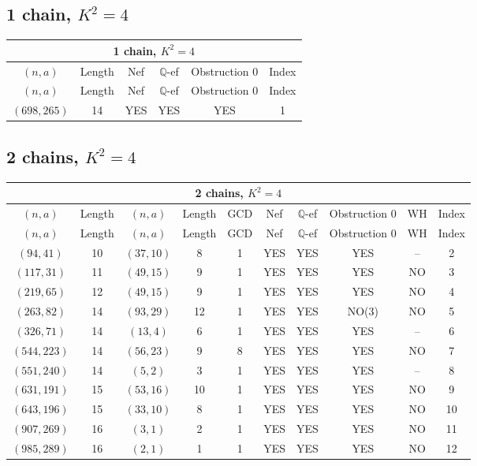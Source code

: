 \subsection{1 chain, $K^2 = 4$}
\begin{longtable}{|c|c|c|c|c|c|}
\hline
\multicolumn{6}{|c|}{1 chain, $K^2 = 4$}\\
\hline
$(n,a)$ & Length & Nef & $\mathbb Q$-ef & Obstruction 0 & Index\\
\hline
\endfirsthead

\hline
$(n,a)$ & Length & Nef & $\mathbb Q$-ef & Obstruction 0 & Index\\
\hline
\endhead
\hline
\endfoot

$(698, 265)$ & 14 & YES & YES & YES & 1
\end{longtable}
\subsection{2 chains, $K^2 = 4$}
\begin{longtable}{|c|c|c|c|c|c|c|c|c|c|}
\hline
\multicolumn{10}{|c|}{2 chains, $K^2 = 4$}\\
\hline
$(n,a)$ & Length & $(n,a)$ & Length & GCD & Nef & $\mathbb Q$-ef & Obstruction 0 & WH & Index\\
\hline
\endfirsthead

\hline
$(n,a)$ & Length & $(n,a)$ & Length & GCD & Nef & $\mathbb Q$-ef & Obstruction 0 & WH & Index\\
\hline
\endhead
\hline
\endfoot

$(94, 41)$ & 10 & $(37, 10)$ & 8 & 1 & YES & YES & YES & -- & 2\\
$(117, 31)$ & 11 & $(49, 15)$ & 9 & 1 & YES & YES & YES & NO & 3\\
$(219, 65)$ & 12 & $(49, 15)$ & 9 & 1 & YES & YES & YES & NO & 4\\
$(263, 82)$ & 14 & $(93, 29)$ & 12 & 1 & YES & YES & NO(3) & NO & 5\\
$(326, 71)$ & 14 & $(13, 4)$ & 6 & 1 & YES & YES & YES & -- & 6\\
$(544, 223)$ & 14 & $(56, 23)$ & 9 & 8 & YES & YES & YES & NO & 7\\
$(551, 240)$ & 14 & $(5, 2)$ & 3 & 1 & YES & YES & YES & -- & 8\\
$(631, 191)$ & 15 & $(53, 16)$ & 10 & 1 & YES & YES & YES & NO & 9\\
$(643, 196)$ & 15 & $(33, 10)$ & 8 & 1 & YES & YES & YES & NO & 10\\
$(907, 269)$ & 16 & $(3, 1)$ & 2 & 1 & YES & YES & YES & NO & 11\\
$(985, 289)$ & 16 & $(2, 1)$ & 1 & 1 & YES & YES & YES & NO & 12
\end{longtable}

